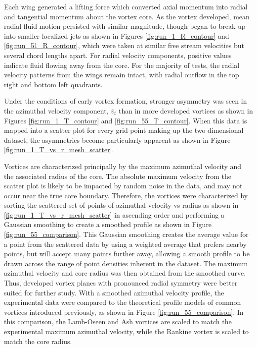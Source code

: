 Each wing generated a lifting force which converted axial momentum into radial 
and tangential momentum about the vortex core. As the vortex developed, mean 
radial fluid motion persisted with similar magnitude, though began to break up 
into smaller localized jets as shown in Figures \ref{fig:run_1_R_contour} and 
\ref{fig:run_51_R_contour}, which were taken at similar free stream velocities 
but several chord lengths apart. For radial velocity components, positive 
values indicate fluid flowing away from the core. For the majority of tests, 
the radial velocity patterns from the wings remain intact, with radial outflow 
in the top right and bottom left quadrants. 

\vspace{32pt}



Under the conditions of early vortex formation, stronger asymmetry was seen in 
the azimuthal velocity component, $\overline v_{t}$ than in more developed 
vortices as 
shown in Figures \ref{fig:run_1_T_contour} and \ref{fig:run_55_T_contour}. When 
this data is mapped into a scatter plot for every grid point making up the 
two dimensional dataset, the asymmetries become particularly apparent as shown 
in Figure \ref{fig:run_1_T_vs_r_mesh_scatter}.

\vspace{32pt}




Vortices are characterized principally by the maximum azimuthal velocity 
and the associated radius of the core. The absolute maximum velocity from the 
scatter plot is likely to be impacted by random noise in the data, and may 
not occur near the true core boundary. Therefore, the vortices were 
characterized by sorting the scattered set of points of azimuthal velocity vs 
radius as shown in \ref{fig:run_1_T_vs_r_mesh_scatter} in ascending order and 
performing a Gaussian smoothing to create a smoothed profile as shown in Figure 
\ref{fig:run_55_comparison}. This Gaussian smoothing creates the average value 
for a point from the scattered data by using a weighted average that prefers 
nearby points, but will accept many points further away, allowing a smooth 
profile to be drawn across the range of point densities inherent in the 
dataset. The 
maximum azimuthal velocity and core radius was then obtained from the smoothed 
curve. Thus,
developed vortex planes with pronounced radial symmetry were better suited for 
further study. With a smoothed azimuthal velocity profile, the experimental 
data were compared to the theoretical profile models of common vortices 
introduced previously, as shown in Figure \ref{fig:run_55_comparison}. In this 
comparison, the Lamb-Oseen and Ash vortices are scaled to match the 
experimental maximum azimuthal velocity, while the Rankine vortex is scaled to 
match the core radius.

